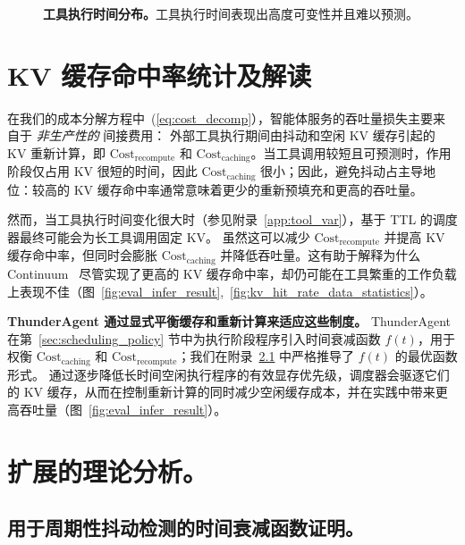\begin{figure}[]
  \caption{\textbf{工具执行时间分布。}工具执行时间表现出高度可变性并且难以预测。}

  \label{fig:tool_time}
\end{figure}

\newpage
\section{KV 缓存命中率统计及解读}
\label{sec:kv_hit_rate_stats}

在我们的成本分解方程中~(\ref{eq:cost_decomp}），智能体服务的吞吐量损失主要来自于 \emph{非生产性的} 间接费用：
外部工具执行期间由抖动和空闲 KV 缓存引起的 KV 重新计算，即
$\text{Cost}_{\text{recompute}}$ 和 $\text{Cost}_{\text{caching}}$。当工具调用较短且可预测时，作用阶段仅占用 KV 很短的时间，因此 $\text{Cost}_{\text{caching}}$ 很小；因此，避免抖动占主导地位：较高的 KV 缓存命中率通常意味着更少的重新预填充和更高的吞吐量。

然而，当工具执行时间变化很大时（参见附录~\ref{app:tool_var}），基于 TTL 的调度器最终可能会为长工具调用固定 KV。
虽然这可以减少 $\text{Cost}_{\text{recompute}}$ 并提高 KV 缓存命中率，但同时会膨胀 $\text{Cost}_{\text{caching}}$ 并降低吞吐量。这有助于解释为什么 Continuum~\cite{li2025continuumefficientrobustmultiturn} 尽管实现了更高的 KV 缓存命中率，却仍可能在工具繁重的工作负载上表现不佳（图~\ref{fig:eval_infer_result},~\ref{fig:kv_hit_rate_data_statistics}）。

\noindent\textbf{ThunderAgent 通过显式平衡缓存和重新计算来适应这些制度。}
ThunderAgent 在第~\ref{sec:scheduling_policy} 节中为执行阶段程序引入时间衰减函数 $f(t)$，用于权衡
$\text{Cost}_{\text{caching}}$ 和 $\text{Cost}_{\text{recompute}}$；我们在附录~\ref{app:ft_discussion} 中严格推导了 \(f(t)\) 的最优函数形式。
通过逐步降低长时间空闲执行程序的有效显存优先级，调度器会驱逐它们的 KV 缓存，从而在控制重新计算的同时减少空闲缓存成本，并在实践中带来更高吞吐量（图~\ref{fig:eval_infer_result}）。







\newpage
\section{扩展的理论分析。}

\subsection{用于周期性抖动检测的时间衰减函数证明。}
\label{app:ft_discussion}


